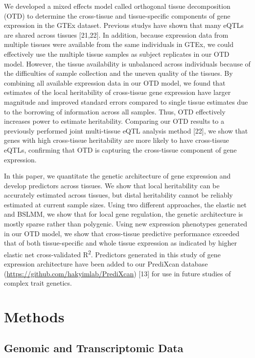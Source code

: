 \documentclass[]{article}
\begin{document}
We developed a mixed effects model called orthogonal tissue
decomposition (OTD) to determine the cross-tissue and tissue-specific
components of gene expression in the GTEx dataset. Previous studys have
shown that many eQTLs are shared across tissues {[}21,22{]}. In
addition, because expression data from multiple tissues were available
from the same individuals in GTEx, we could effectively use the multiple
tissue samples as subject replicates in our OTD model. However, the
tissue availability is unbalanced across individuals because of the
difficulties of sample collection and the uneven quality of the tissues.
By combining all available expression data in our OTD model, we found
that estimates of the local heritability of cross-tissue gene expression
have larger magnitude and improved standard errors compared to single
tissue estimates due to the borrowing of information across all samples.
Thus, OTD effectively increases power to estimate heritability.
Comparing our OTD results to a previously performed joint multi-tissue
eQTL analysis method {[}22{]}, we show that genes with high cross-tissue
heritability are more likely to have cross-tissue eQTLs, confirming that
OTD is capturing the cross-tissue component of gene expression.

In this paper, we quantitate the genetic architecture of gene expression
and develop predictors across tissues. We show that local heritability
can be accurately estimated across tissues, but distal heritability
cannot be reliably estimated at current sample sizes. Using two
different approaches, the elastic net and BSLMM, we show that for local
gene regulation, the genetic architecture is mostly sparse rather than
polygenic. Using new expression phenotypes generated in our OTD model,
we show that cross-tissue predictive performance exceeded that of both
tissue-specific and whole tissue expression as indicated by higher
elastic net cross-validated R\textsuperscript{2}. Predictors generated
in this study of gene expression architecture have been added to our
PrediXcan database (\url{https://github.com/hakyimlab/PrediXcan})
{[}13{]} for use in future studies of complex trait genetics.

\section{Methods}\label{methods}

\subsection{Genomic and Transcriptomic
Data}\label{genomic-and-transcriptomic-data}
\end{document}
